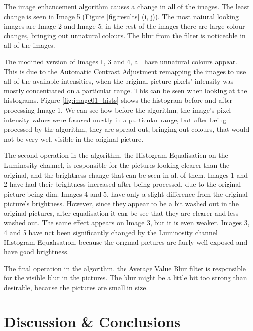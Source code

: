 \documentclass[journal,transmag]{IEEEtran}
\begin{document}
The image enhancement algorithm causes a change in all of the images. 
The least change is seen in Image 5 (Figure \ref{fig:results} (i, j)). The most natural looking images are Image 2 and Image 5; in the rest of the images there are large colour changes, bringing out unnatural colours. The blur from the filter is noticeable in all of the images.

The modified version of Images 1, 3 and 4, all have unnatural colours appear. This is due to the Automatic Contrast Adjustment remapping the images to use all of the available intensities, when the original picture pixels' intensity was mostly concentrated on a particular range. This can be seen when looking at the histograms. Figure \ref{fig:image01_hists} shows the histogram before and after processing Image 1. We can see how before the algorithm, the image's pixel intensity values were focused mostly in a particular range, but after being processed by the algorithm, they are spread out, bringing out colours, that would not be very well visible in the original picture.

The second operation in the algorithm, the Histogram Equalisation on the Luminosity channel, is responsible for the pictures looking clearer than the original, and the brightness change that can be seen in all of them. Images 1 and 2 have had their brightness increased after being processed, due to the original picture being dim. Images 4 and 5, have only a slight difference from the original picture's brightness. However, since they appear to be a bit washed out in the original pictures, after equalisation it can be see that they are clearer and less washed out. The same effect appears on Image 3, but it is even weaker. Images 3, 4 and 5 have not been significantly changed by the Luminosity channel Histogram Equalisation, because the original pictures are fairly well exposed and have good brightness.

The final operation in the algorithm, the Average Value Blur filter is responsible for the visible blur in the pictures. The blur might be a little bit too strong than desirable, because the pictures are small in size.


\section{Discussion \& Conclusions}
\label{sec:discussion}
\end{document}
